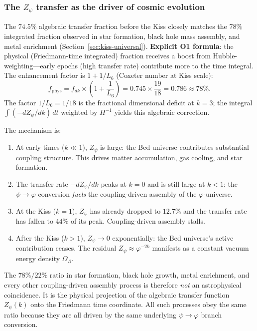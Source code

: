 \documentclass[12pt,a4paper]{article}
\newcommand{\bed}{Bed universe}
\begin{document}
\subsubsection{The $Z_\psi$ transfer as the driver of cosmic evolution}
\label{sec:psi-transfer}

The $74.5\%$ algebraic transfer fraction before the Kiss closely matches the $78\%$ integrated fraction observed in star formation, black hole mass assembly, and metal enrichment (Section~\ref{sec:kiss-universal}).  \textbf{Explicit O1 formula}: the physical (Friedmann-time integrated) fraction receives a boost from Hubble-weighting---early epochs (high transfer rate) contribute more to the time integral. The enhancement factor is $1 + 1/L_6$ (Coxeter number at Kiss scale):
\begin{equation}
f_{\mathrm{phys}} = f_{dk} \times \left(1 + \frac{1}{L_6}\right) = 0.745 \times \frac{19}{18} = 0.786 \approx 78\%.
\label{eq:transfer-O1}
\end{equation}
The factor $1/L_6 = 1/18$ is the fractional dimensional deficit at $k = 3$; the integral $\int (-dZ_\psi/dk)\, dt$ weighted by $H^{-1}$ yields this algebraic correction.

The mechanism is:
\begin{enumerate}
\item At early times ($k \ll 1$), $Z_\psi$ is large: the \bed{} contributes substantial coupling structure.  This drives matter accumulation, gas cooling, and star formation.
\item The transfer rate $-dZ_\psi/dk$ peaks at $k = 0$ and is still large at $k < 1$: the $\psi \to \varphi$ conversion \emph{fuels} the coupling-driven assembly of the $\varphi$-universe.
\item At the Kiss ($k = 1$), $Z_\psi$ has already dropped to $12.7\%$ and the transfer rate has fallen to $44\%$ of its peak.  Coupling-driven assembly stalls.
\item After the Kiss ($k > 1$), $Z_\psi \to 0$ exponentially: the \bed{}'s active contribution ceases.  The residual $Z_\psi \approx \varphi^{-2k}$ manifests as a constant vacuum energy density $\Omega_\Lambda$.
\end{enumerate}

\noindent The $78\%/22\%$ ratio in star formation, black hole growth, metal enrichment, and every other coupling-driven assembly process is therefore \emph{not} an astrophysical coincidence.  It is the physical projection of the algebraic transfer function $Z_\psi(k)$ onto the Friedmann time coordinate.  All such processes obey the same ratio because they are all driven by the same underlying $\psi \to \varphi$ branch conversion.
\end{document}

